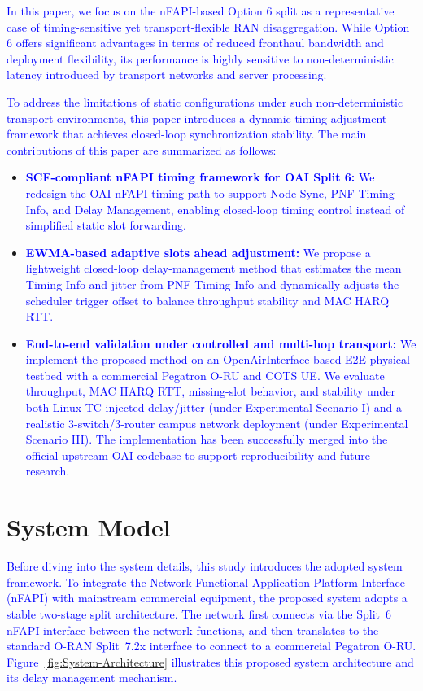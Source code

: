 \documentclass[10pt, conference, letterpaper]{IEEEtran}
\begin{document}
\textcolor{blue}{In this paper, we focus on the nFAPI-based Option 6 split as a representative case of timing-sensitive yet transport-flexible RAN disaggregation. While Option 6 offers significant advantages in terms of reduced fronthaul bandwidth and deployment flexibility, its performance is highly sensitive to non-deterministic latency introduced by transport networks and server processing.}

\textcolor{blue}{To address the limitations of static configurations under such non-deterministic transport environments, this paper introduces a dynamic timing adjustment framework that achieves closed-loop synchronization stability. The main contributions of this paper are summarized as follows:}

\begin{itemize}
\item \textcolor{blue}{\textbf{SCF-compliant nFAPI timing framework for OAI Split 6:} We redesign the OAI nFAPI timing path to support Node Sync, PNF Timing Info, and Delay Management, enabling closed-loop timing control instead of simplified static slot forwarding.}
\item \textcolor{blue}{\textbf{EWMA-based adaptive slots ahead adjustment:} We propose a lightweight closed-loop delay-management method that estimates the mean Timing Info and jitter from PNF Timing Info and dynamically adjusts the scheduler trigger offset to balance throughput stability and MAC HARQ RTT.}
\item \textcolor{blue}{\textbf{End-to-end validation under controlled and multi-hop transport:} We implement the proposed method on an OpenAirInterface-based E2E physical testbed with a commercial Pegatron O-RU and COTS UE. We evaluate throughput, MAC HARQ RTT, missing-slot behavior, and stability under both Linux-TC-injected delay/jitter (under Experimental Scenario I) and a realistic 3-switch/3-router campus network deployment (under Experimental Scenario III). The implementation has been successfully merged into the official upstream OAI codebase to support reproducibility and future research.}
\end{itemize}

\section{System Model}
\label{sec:system_architecture}

\textcolor{blue}{Before diving into the system details, this study introduces the adopted system framework. To integrate the Network Functional Application Platform Interface (nFAPI) with mainstream commercial equipment, the proposed system adopts a stable two-stage split architecture. The network first connects via the Split~6 nFAPI interface between the network functions, and then translates to the standard O-RAN Split~7.2x interface to connect to a commercial Pegatron O-RU. Figure~\ref{fig:System-Architecture} illustrates this proposed system architecture and its delay management mechanism.}
\end{document}
